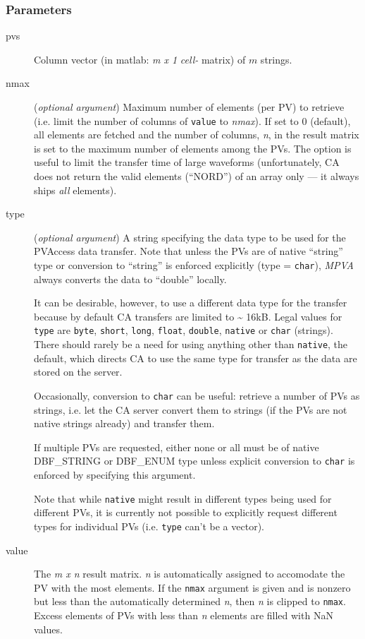 \documentclass{article}
\newcommand{\sca}{\ita{MPVA}}
\newcommand{\com}[1]{{\tt #1}}
\newcommand{\NAN}{\mbox{NaN}}
\newcommand{\ita}[1]{\emph{#1}}
\newcommand{\m}{$m$}
\newcommand{\mhack}{$m$} %
\newcommand{\n}{$n$}
\newcommand{\mxn}{$m\times n$}
\newcommand{\mxl}{$m\times 1$}
\newcommand{\calimit}{$\approx 16$kB}
\renewcommand{\m}{\ita{m}}
\newcommand{\mhack}{\ita{m}} %
\renewcommand{\n}{\ita{n}}
\renewcommand{\mxn}{\ita{m x n}}
\renewcommand{\mxl}{\ita{m x 1}}
\renewcommand{\calimit}{\~{} 16kB}
\newcommand{\PVITEM}{
\item[pvs] Column vector (in matlab: \mxl{} \ita{cell-} matrix)
of \mhack{} strings.
}
\begin{document}
\subsubsection{Parameters}
\begin{description}
\PVITEM
%
%
\item[nmax] \label{nmaxarg}
(\ita{optional argument}) Maximum number of elements
(per PV) to retrieve (i.e. limit the number of columns of \com{value} to
\ita{nmax}).
If set to 0 (default), all elements are fetched
and the number of columns, \n, in the result matrix is set to the
maximum number of elements among the PVs. The option is useful
to limit the transfer time of large waveforms (unfortunately,
CA does not return the valid elements (``NORD'') of
an array only --- it always ships \ita{all} elements).
%
%
\item[type] \label{typearg}
(\ita{optional argument}) A string specifying the
data type to be used for the PVAccess data transfer. Note
that unless the PVs are of native ``string'' type or conversion to
``string'' is enforced explicitly (type = \com{char}), \sca{}
always converts the data to ``double'' locally.

It can be desirable, however, to use a different data type for the
transfer because by default CA transfers are limited to \calimit.
Legal values for \com{type}{} are \com{byte}, \com{short}, \com{long},
\com{float}, \com{double}, \com{native} or \com{char} (strings).
There should rarely be a need for using anything other than \com{native},
the default, which directs CA to use the same type for transfer as the
data are stored on the server.

Occasionally, conversion to \com{char} can be useful: retrieve a number
of PVs as strings, i.e. let the CA server convert them to strings
(if the PVs are not native strings already) and transfer them.

If multiple PVs are requested, either none or all must be of native
DBF\_STRING or DBF\_ENUM type unless explicit conversion to \com{char}
is enforced by specifying this argument.

Note that while \com{native}{} might result in different types
being used for different PVs, it is currently not possible to
explicitly request different types for individual PVs (i.e.
\com{type}{} can't be a vector).
%
%
\item[value] The \mxn{} result matrix. \n{} is automatically
assigned to accomodate the PV with the most elements. If the \com{nmax}{}
argument is given and is nonzero but less than the automatically
determined \n, then \n{} is clipped to \com{nmax}.
Excess elements of PVs with less than \n{} elements are filled with
\NAN{} values.


\end{description}
\end{document}
